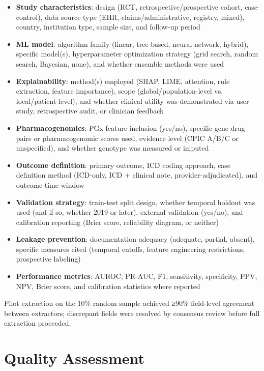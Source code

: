 \documentclass[
  12pt,
]{book}
\providecommand{\tightlist}{%
  \setlength{\itemsep}{0pt}\setlength{\parskip}{0pt}}
\begin{document}
\begin{itemize}
\tightlist
\item
  \textbf{Study characteristics}: design (RCT, retrospective/prospective
  cohort, case-control), data source type (EHR, claims/administrative,
  registry, mixed), country, institution type, sample size, and
  follow-up period
\item
  \textbf{ML model}: algorithm family (linear, tree-based, neural
  network, hybrid), specific model(s), hyperparameter optimization
  strategy (grid search, random search, Bayesian, none), and whether
  ensemble methods were used
\item
  \textbf{Explainability}: method(s) employed (SHAP, LIME, attention,
  rule extraction, feature importance), scope (global/population-level
  vs. local/patient-level), and whether clinical utility was
  demonstrated via user study, retrospective audit, or clinician
  feedback
\item
  \textbf{Pharmacogenomics}: PGx feature inclusion (yes/no), specific
  gene-drug pairs or pharmacogenomic scores used, evidence level (CPIC
  A/B/C or unspecified), and whether genotype was measured or imputed
\item
  \textbf{Outcome definition}: primary outcome, ICD coding approach,
  case definition method (ICD-only, ICD + clinical note,
  provider-adjudicated), and outcome time window
\item
  \textbf{Validation strategy}: train-test split design, whether
  temporal holdout was used (and if so, whether 2019 or later), external
  validation (yes/no), and calibration reporting (Brier score,
  reliability diagram, or neither)
\item
  \textbf{Leakage prevention}: documentation adequacy (adequate,
  partial, absent), specific measures cited (temporal cutoffs, feature
  engineering restrictions, prospective labeling)
\item
  \textbf{Performance metrics}: AUROC, PR-AUC, F1, sensitivity,
  specificity, PPV, NPV, Brier score, and calibration statistics where
  reported
\end{itemize}

Pilot extraction on the 10\% random sample achieved ≥90\% field-level
agreement between extractors; discrepant fields were resolved by
consensus review before full extraction proceeded.

\section{Quality Assessment}\label{quality-assessment}
\end{document}
